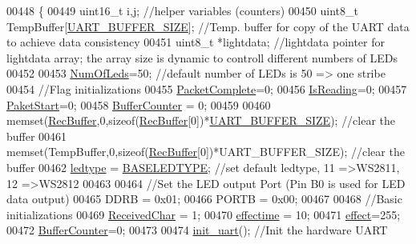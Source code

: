 \begin{DoxyCode}
{00448 \{
00449     uint16\_t i,j;                           \textcolor{comment}{//helper variables (counters)}
00450     uint8\_t TempBuffer[\hyperlink{globals_8h_a0d57378e32bf8278011460740bc29f7f}{UART\_BUFFER\_SIZE}];   \textcolor{comment}{//Temp. buffer for copy of the UART data to
       achieve data consistency    }
00451     uint8\_t *lightdata;                     \textcolor{comment}{//lightdata pointer for lightdata array; the array size is
       dynamic to controll different numbers of LEDs}
00452     
00453     \hyperlink{globals_8h_ad5db4045aed262ed4aae2af9d81fab98}{NumOfLeds}=50;                          \textcolor{comment}{//default number of LEDs is 50 => one stribe}
00454     \textcolor{comment}{//Flag initializations}
00455     \hyperlink{globals_8h_a1b09d1a5bcf4c8ab435bb3c9e36def59}{PacketComplete}=0;                         
00456     \hyperlink{globals_8h_a922ad5baed647eca43ad1a979e162ebd}{IsReading}=0;
00457     \hyperlink{globals_8h_aaa3bddd2273257ac5ec259197b62e984}{PaketStart}=0; 
00458     \hyperlink{globals_8h_aa6fcb4d4fca4554ac73bef10668c23cd}{BufferCounter} = 0;
00459 
00460     memset(\hyperlink{globals_8h_a5d735865707e6694a8173d629e0b4d5c}{RecBuffer},0,\textcolor{keyword}{sizeof}(\hyperlink{globals_8h_a5d735865707e6694a8173d629e0b4d5c}{RecBuffer}[0])*\hyperlink{globals_8h_a0d57378e32bf8278011460740bc29f7f}{UART\_BUFFER\_SIZE});    \textcolor{comment}{//clear
       the buffer  }
00461     memset(TempBuffer,0,\textcolor{keyword}{sizeof}(\hyperlink{globals_8h_a5d735865707e6694a8173d629e0b4d5c}{RecBuffer}[0])*UART\_BUFFER\_SIZE);    \textcolor{comment}{//clear the buffer}
00462     \hyperlink{globals_8h_a722e1eb38b661d1338ada3cc7a4049a0}{ledtype} = \hyperlink{globals_8h_af07a5ce170c7be13d096843960e7b9da}{BASELEDTYPE};                    \textcolor{comment}{//set default ledtype, 11 =>WS2811, 12
       =>WS2812}
00463     
00464     \textcolor{comment}{//Set the LED output Port (Pin B0 is used for LED data output)}
00465     DDRB = 0x01;                        
00466     PORTB = 0x00;
00467 
00468     \textcolor{comment}{//Basic initializations}
00469     \hyperlink{globals_8h_ab5490074aaca289e986e9a00e0c25663}{ReceivedChar} = 1;
00470     \hyperlink{globals_8h_ac2445d316b2972d381edeac44bb6a226}{effectime} = 10;
00471     \hyperlink{globals_8h_a053b8e1f039c19251b90d60317db8aed}{effect}=255;
00472     \hyperlink{globals_8h_aa6fcb4d4fca4554ac73bef10668c23cd}{BufferCounter}=0;
00473     
00474     \hyperlink{ws2811lichterkette_8c_ac7b3df0fa68526d64c732d5f916e34b1}{init\_uart}();                           \textcolor{comment}{//Init the hardware UART}
}
\end{DoxyCode}
